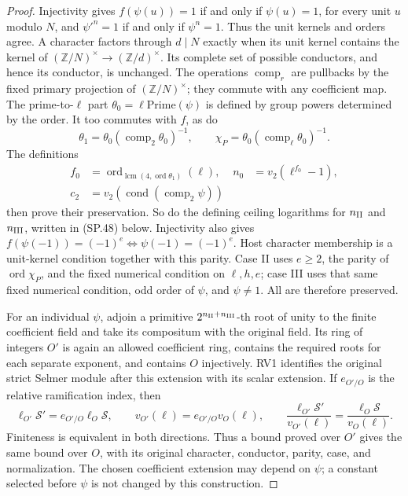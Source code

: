 \begin{proof}
Injectivity gives $f(\psi(u))=1$ if and only if $\psi(u)=1$,
for every unit $u$ modulo $N$, and $\psi'^n=1$ if and only if
$\psi^n=1$.  Thus the unit kernels and orders agree.
A character factors through $d\mid N$ exactly when its unit kernel
contains the kernel of $(\mathbb Z/N)^\times\to(\mathbb Z/d)^\times$.
Its complete set of possible conductors, and hence its conductor,
is unchanged.  The operations $\operatorname{comp}_r$ are pullbacks
by the fixed primary projection of $(\mathbb Z/N)^\times$; they
commute with any coefficient map.
The prime-to-$\ell$ part $\theta_0=\ell\mathrm{Prime}(\psi)$ is
defined by group powers determined by the order.  It too commutes
with $f$, as do
\[
 \theta_1=\theta_0(\operatorname{comp}_2\theta_0)^{-1},\qquad
 \chi_P=\theta_0(\operatorname{comp}_\ell\theta_0)^{-1}.
\]
The definitions
\[
 \begin{aligned}
 f_0&=\operatorname{ord}_{\operatorname{lcm}(4,\operatorname{ord}\theta_1)}(\ell),
 &n_0&=v_2(\ell^{f_0}-1),\\
 c_2&=v_2(\operatorname{cond}(\operatorname{comp}_2\psi))
 \end{aligned}
 \tag{SP.41}
\]
then prove their preservation.  So do the defining ceiling logarithms
for $n_{\rm II}$ and $n_{\rm III}$, written in (SP.48) below.
Injectivity also gives
$f(\psi(-1))=(-1)^e\Longleftrightarrow\psi(-1)=(-1)^e$.
Host character membership is a unit-kernel condition together with
this parity.  Case II uses $e\ge2$, the parity of
$\operatorname{ord}\chi_P$, and the fixed numerical condition on
$\ell,h,e$; case III uses that same fixed numerical condition,
odd order of $\psi$, and $\psi\ne1$.  All are therefore preserved.

For an individual $\psi$, adjoin a primitive
$2^{n_{\rm II}+n_{\rm III}}$-th root of unity to the finite
coefficient field and take its compositum with the original field.
Its ring of integers $O'$ is again an allowed coefficient ring,
contains the required roots for each separate exponent, and
contains $O$ injectively.  RV1 identifies the original strict
Selmer module after this extension with its scalar extension.
If $e_{O'/O}$ is the relative ramification index, then
\[
 \ell_{O'}\mathcal S'=e_{O'/O}\ell_O\mathcal S,
 \qquad v_{O'}(\ell)=e_{O'/O}v_O(\ell),\qquad
 \frac{\ell_{O'}\mathcal S'}{v_{O'}(\ell)}
       =\frac{\ell_O\mathcal S}{v_O(\ell)}.
 \tag{SP.42}
\]
Finiteness is equivalent in both directions.  Thus a bound proved
over $O'$ gives the same bound over $O$, with its original
character, conductor, parity, case, and normalization.  The chosen
coefficient extension may depend on $\psi$; a constant selected
before $\psi$ is not changed by this construction.
\end{proof}

